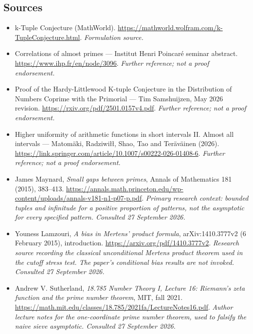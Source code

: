 \documentclass[11pt]{article}
\begin{document}
\subsection{Sources}
\begin{itemize}
\item[S1]k-Tuple Conjecture (MathWorld).
\url{https://mathworld.wolfram.com/k-TupleConjecture.html}.
\textit{Formulation source.}
\item[S2]Correlations of almost primes — Institut Henri Poincaré seminar abstract.
\url{https://www.ihp.fr/en/node/3096}.
\textit{Further reference; not a proof endorsement.}
\item[S3]Proof of the Hardy-Littlewood K-tuple Conjecture in the Distribution of Numbers Coprime with the Primorial — Tim Samshuijzen, May 2026 revision.
\url{https://rxiv.org/pdf/2501.0157v4.pdf}.
\textit{Further reference; not a proof endorsement.}
\item[S4]Higher uniformity of arithmetic functions in short intervals II. Almost all intervals — Matomäki, Radziwiłł, Shao, Tao and Teräväinen (2026).
\url{https://link.springer.com/article/10.1007/s00222-026-01408-6}.
\textit{Further reference; not a proof endorsement.}

\item[E1]James Maynard, \emph{Small gaps between primes},
Annals of Mathematics 181 (2015), 383--413.
\url{https://annals.math.princeton.edu/wp-content/uploads/annals-v181-n1-p07-p.pdf}.
\textit{Primary research context: bounded tuples and infinitude for a positive
proportion of patterns, not the asymptotic for every specified pattern.
Consulted 27 September 2026.}
\item[E2]Youness Lamzouri, \emph{A bias in Mertens' product formula},
arXiv:1410.3777v2 (6 February 2015), introduction.
\url{https://arxiv.org/pdf/1410.3777v2}.
\textit{Research source recording the classical unconditional Mertens product
theorem used in the cutoff stress test. The paper's conditional bias results
are not invoked. Consulted 27 September 2026.}
\item[E3]Andrew V. Sutherland, \emph{18.785 Number Theory I, Lecture 16:
Riemann's zeta function and the prime number theorem}, MIT, fall 2021.
\url{https://math.mit.edu/classes/18.785/2021fa/LectureNotes16.pdf}.
\textit{Author lecture notes for the one-coordinate prime number theorem,
used to falsify the naive sieve asymptotic. Consulted 27 September 2026.}
\end{itemize}
\end{document}
